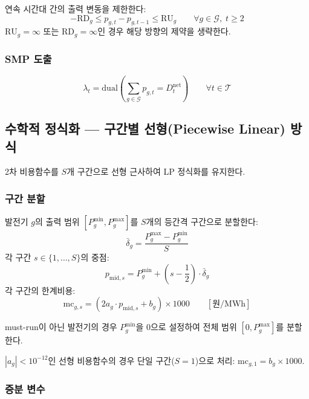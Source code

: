 \documentclass[11pt, a4paper]{article}
\begin{document}
연속 시간대 간의 출력 변동을 제한한다:
\begin{equation}\label{eq:ramp}
    -\text{RD}_g \leq p_{g,t} - p_{g,t-1} \leq \text{RU}_g \qquad \forall g \in \mathcal{G}, \; t \geq 2
\end{equation}
$\text{RU}_g = \infty$ 또는 $\text{RD}_g = \infty$인 경우 해당 방향의 제약을 생략한다.

\subsubsection{SMP 도출}
\begin{equation}
    \lambda_t = \text{dual}\!\left(\sum_{g \in \mathcal{G}} p_{g,t} = D_t^{\text{net}}\right) \qquad \forall t \in \mathcal{T}
\end{equation}

\subsection{수학적 정식화 --- 구간별 선형(Piecewise Linear) 방식}\label{sec:piecewise}

2차 비용함수를 $S$개 구간으로 선형 근사하여 LP 정식화를 유지한다.

\subsubsection{구간 분할}

발전기 $g$의 출력 범위 $[P_g^{\min}, P_g^{\max}]$를 $S$개의 등간격 구간으로 분할한다:
\begin{equation}\label{eq:pw_delta}
    \bar{\delta}_g = \frac{P_g^{\max} - P_g^{\min}}{S}
\end{equation}
각 구간 $s \in \{1, \ldots, S\}$의 중점:
\begin{equation}\label{eq:pw_mid}
    p_{\text{mid},s} = P_g^{\min} + \left(s - \frac{1}{2}\right) \cdot \bar{\delta}_g
\end{equation}
각 구간의 한계비용:
\begin{equation}\label{eq:pw_mc}
    \boxed{\text{mc}_{g,s} = (2a_g \cdot p_{\text{mid},s} + b_g) \times 1000 \qquad [\text{원/MWh}]}
\end{equation}

must-run이 아닌 발전기의 경우 $P_g^{\min}$을 0으로 설정하여
전체 범위 $[0, P_g^{\max}]$를 분할한다.

$|a_g| < 10^{-12}$인 선형 비용함수의 경우 단일 구간($S=1$)으로 처리:
$\text{mc}_{g,1} = b_g \times 1000$.

\subsubsection{증분 변수}
\end{document}
